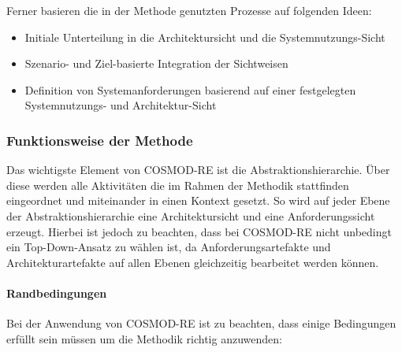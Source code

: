 Ferner basieren die in der Methode genutzten Prozesse auf folgenden Ideen: \cite{Pohl} \\

\begin{itemize}
\item Initiale Unterteilung in die Architektursicht und die Systemnutzungs-Sicht
\item Szenario- und Ziel-basierte Integration der Sichtweisen
\item Definition von Systemanforderungen basierend auf einer festgelegten Systemnutzungs- und Architektur-Sicht \\
\end{itemize}

\subsubsection{Funktionsweise der Methode}
Das wichtigste Element von COSMOD-RE ist die Abstraktionshierarchie. Über diese werden alle Aktivitäten die im Rahmen der Methodik stattfinden eingeordnet und miteinander in einen Kontext gesetzt. So wird auf jeder Ebene der Abstraktionshierarchie eine Architektursicht und eine Anforderungssicht erzeugt. Hierbei ist jedoch zu beachten, dass bei COSMOD-RE nicht unbedingt ein Top-Down-Ansatz zu wählen ist, da Anforderungsartefakte und Architekturartefakte auf allen Ebenen gleichzeitig bearbeitet werden können.\\

\paragraph{Randbedingungen}
Bei der Anwendung von COSMOD-RE ist zu beachten, dass einige Bedingungen erfüllt sein müssen um die Methodik richtig anzuwenden:\\

